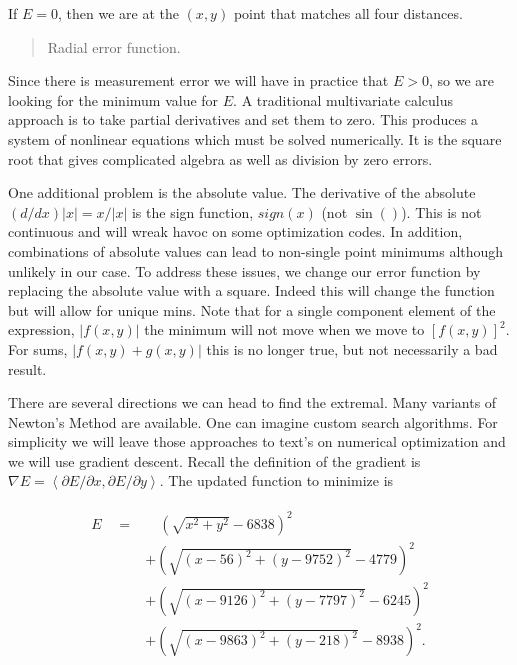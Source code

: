 If \(E=0\), then we are at the \((x,y)\) point that matches all four
distances.

\begin{quote}
Radial error function.
\end{quote}

Since there is measurement error we will have in practice that
\(E > 0\), so we are looking for the minimum value for \(E\). A
traditional multivariate calculus approach is to take partial
derivatives and set them to zero. This produces a system of nonlinear
equations which must be solved numerically. It is the square root that
gives complicated algebra as well as division by zero errors.

One additional problem is the absolute value. The derivative of the
absolute \((d/dx) |x| = x /|x|\) is the sign function, \(sign(x)\) (not
\(\sin ()\)). This is not continuous and will wreak havoc on some
optimization codes. In addition, combinations of absolute values can
lead to non-single point minimums although unlikely in our case. To
address these issues, we change our error function by replacing the
absolute value with a square. Indeed this will change the function but
will allow for unique mins. Note that for a single component element of
the expression, \(|f(x,y)|\) the minimum will not move when we move to
\([f(x,y)]^2\). For sums, \(|f(x,y) + g(x,y)|\) this is no longer true,
but not necessarily a bad result.

There are several directions we can head to find the extremal. Many
variants of Newton's Method are available. One can imagine custom search
algorithms. For simplicity we will leave those approaches to text's on
numerical optimization and we will use gradient descent. Recall the
definition of the gradient is
\(\nabla E = \left< \partial E / \partial x, \partial E / \partial y \right>\).
The updated function to minimize is

\[\begin{aligned}
\begin{array}{ll}
E \quad = & \quad  \left(\sqrt{x^2 + y^2} - 6838\right)^2     \\[3mm]
 &+ \left(\sqrt{(x-56)^2 + (y-9752)^2} - 4779\right)^2    \\[3mm]
& + \left(\sqrt{(x-9126)^2  + (y-7797)^2} - 6245\right)^2   \\[3mm]
& + \left(\sqrt{(x-9863)^2 + (y-218)^2} - 8938\right)^2 .
\end{array}
\end{aligned}\]

